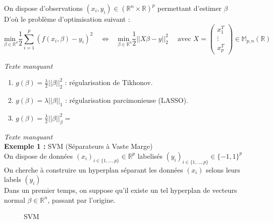 \documentclass[12pt,a4paper]{article}
\begin{document}
On dispose d'observations $(x_i, y_i) \in (\mathbb{R}^n \times \mathbb{R})^p$ permettant d'estimer $\beta$\\

D'où le problème d'optimisation suivant :\\
\begin{equation}
    \underset{\beta \in \mathbb{R}^n}{\text{min }} \frac{1}{2} \sum_{i=1}^p (f(x_i, \beta) - y_i)^2 \quad \Leftrightarrow \quad \underset{\beta \in \mathbb{R}^n}{\text{min }} \frac{1}{2} ||X\beta - y||_2^2 \quad \text{ avec } X = 
    \begin{pmatrix}
        x_1^T\\
        \vdots\\
        x_p^T
    \end{pmatrix}
    \in \mathbb{M}_{p,n}(\mathbb{R})
\end{equation}


\textit{Texte manquant}\\

\begin{enumerate}[label=\roman*)]
    \item $g(\beta) = \frac{\lambda}{2}||\beta||_2^2$ : régularisation de Tikhonov.
    \item $g(\beta) = \lambda ||\beta||_1$ : régularisation parcimonieuse (LASSO).
    \item $g(\beta) = \frac{\lambda}{2}||\beta||_\beta^2 = $\\
\end{enumerate}

\textit{Texte manquant}\\


\noindent\textbf{Exemple 1 :} SVM (Séparateurs à Vaste Marge)\\
On dispose de données $(x_i)_{i \in \{1, \dots, p\}} \in \mathbb{R}^p$ labelisés $(y_i)_{i \in \{1, \dots, p\}} \in \{-1, 1\}^p$\\
On cherche à construire un hyperplan séparant les données $(x_i)$ selons leurs labels $(y_i)$\\

Dans un premier temps, on suppose qu'il existe un tel hyperplan de vecteurs normal $\beta \in \mathbb{R}^n$, passant par l'origine.\\

\begin{figure}
    \centering
    
    \caption{SVM}
    \label{fig:SVM}
\end{figure}
\end{document}
